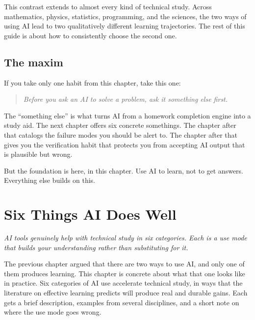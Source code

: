 \documentclass[11pt]{book}
\begin{document}
This contrast extends to almost every kind of technical study. Across mathematics, physics, statistics, programming, and the sciences, the two ways of using AI lead to two qualitatively different learning trajectories. The rest of this guide is about how to consistently choose the second one.

\section{The maxim}

If you take only one habit from this chapter, take this one:

\begin{quote}
\textit{Before you ask an AI to solve a problem, ask it something else first.}
\end{quote}

The ``something else'' is what turns AI from a homework completion engine into a study aid. The next chapter offers six concrete somethings. The chapter after that catalogs the failure modes you should be alert to. The chapter after that gives you the verification habit that protects you from accepting AI output that is plausible but wrong.

But the foundation is here, in this chapter. Use AI to learn, not to get answers. Everything else builds on this.

\chapter{Six Things AI Does Well}
\label{ch:six-well}

\noindent \emph{AI tools genuinely help with technical study in six categories. Each is a use mode that builds your understanding rather than substituting for it.}

\medskip

The previous chapter argued that there are two ways to use AI, and only one of them produces learning. This chapter is concrete about what that one looks like in practice. Six categories of AI use accelerate technical study, in ways that the literature on effective learning predicts will produce real and durable gains. Each gets a brief description, examples from several disciplines, and a short note on where the use mode goes wrong.
\end{document}
